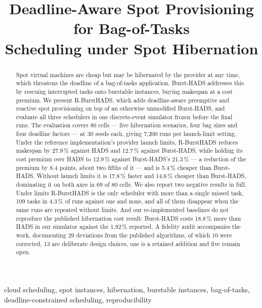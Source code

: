 \documentclass[conference]{IEEEtran}
\begin{document}
\title{Deadline-Aware Spot Provisioning for Bag-of-Tasks\\
Scheduling under Spot Hibernation}

\author{\IEEEauthorblockN{}\IEEEauthorblockA{}}

\maketitle

\begin{abstract}
Spot virtual machines are cheap but may be hibernated by the provider at any
time, which threatens the deadline of a bag-of-tasks application. Burst-HADS
addresses this by rescuing interrupted tasks onto burstable instances, buying
makespan at a cost premium. We present R-BurstHADS, which adds deadline-aware
preemptive and reactive spot provisioning on top of an otherwise unmodified
Burst-HADS, and evaluate all three schedulers in one discrete-event simulator
frozen before the final runs. The evaluation covers 80 cells --- five
hibernation scenarios, four bag sizes and four deadline factors --- at 30 seeds
each, giving 7{,}200 runs per launch-limit setting. Under the reference
implementation's provider launch limits, R-BurstHADS reduces makespan by
27.9\,\% against HADS and 12.7\,\% against Burst-HADS, while holding its cost
premium over HADS to 12.9\,\% against Burst-HADS's 21.3\,\% --- a reduction of
the premium by 8.4 points, about two fifths of it --- and is 5.4\,\% cheaper
than Burst-HADS. Without launch limits it is 17.8\,\% faster and 14.6\,\%
cheaper than Burst-HADS, dominating it on both axes in 69 of 80 cells. We also
report two negative results in full. Under limits R-BurstHADS is the only
scheduler with more than a single missed task, 109 tasks in 4.3\,\% of runs
against one and none, and all of them disappear when the same runs are repeated
without limits. And our re-implemented baselines do not reproduce the published
hibernation cost result: Burst-HADS costs 18.8\,\% more than HADS in our
simulator against the 1.92\,\% reported. A fidelity audit accompanies the work,
documenting 29 deviations from the published algorithms, of which 10 were
corrected, 13 are deliberate design choices, one is a retained addition and five
remain open.
\end{abstract}

\begin{IEEEkeywords}
cloud scheduling, spot instances, hibernation, burstable instances,
bag-of-tasks, deadline-constrained scheduling, reproducibility
\end{IEEEkeywords}
\end{document}
